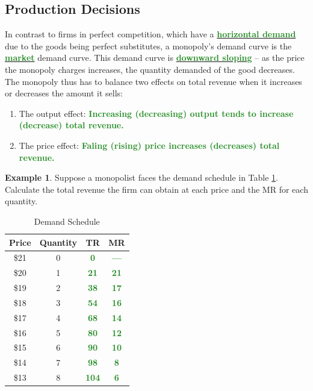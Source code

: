 \documentclass[11pt]{article}\usepackage[]{graphicx}\usepackage[]{color}
\theoremstyle{definition}
\newtheorem{exmp}{Example}[section]
\newcommand{\ddp}[1]{{\textbf{\textcolor{ForestGreen}{#1}}}}
\newcommand{\dd}[1]{{\underline{\textbf{\textcolor{ForestGreen}{#1}}}}}
\begin{document}
	\subsection{Production Decisions}
	
	In contrast to firms in perfect competition, which have a \dd{horizontal demand} due to the goods being perfect substitutes, a monopoly's demand curve is the \dd{market} demand curve. This demand curve is \dd{downward sloping} -- as the price the monopoly charges increases, the quantity demanded of the good decreases.
	\\
	
	The monopoly thus has to balance two effects on total revenue when it increases or decreases the amount it sells:
	
	\begin{enumerate}
		\setlength\itemsep{1em}
		\item The output effect: \ddp{Increasing (decreasing) output tends to increase (decrease) total revenue.}
		\item The price effect: \ddp{Faling (rising) price increases (decreases) total revenue.}
	\end{enumerate}
	\vspace{1em}
	
	\begin{exmp} Suppose a monopolist faces the demand schedule in Table \ref{mono}. Calculate the total revenue the firm can obtain at each price and the MR for each quantity.
	
	\begin{table}[ht]
		\centering
		\caption{Demand Schedule}
		\label{mono}
		\begin{tabular}{ c|c|c|c}        
			
			Price & Quantity & TR & MR  \\
			\hline
			\$21 & 0 &  \ddp{0}&  \ddp{---} \\
			\$20 & 1 & \ddp{21}& \ddp{21}\\
			\$19 & 2 & \ddp{38}& \ddp{17}\\
			\$18 & 3 & \ddp{54}& \ddp{16}\\
			\$17 & 4 & \ddp{68}& \ddp{14}\\
			\$16 & 5 & \ddp{80}& \ddp{12}\\
			\$15 & 6 & \ddp{90}& \ddp{10}\\
			\$14 & 7 & \ddp{98}&  \ddp{8}\\
			\$13 & 8 & \ddp{104}&  \ddp{6}\\
		\end{tabular}
	\end{table}
	\end{exmp} 
	
\end{document}
